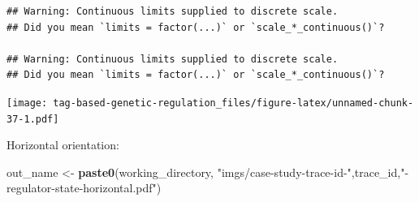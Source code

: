 \documentclass[
]{book}
\newenvironment{Shaded}{\begin{snugshade}}{\end{snugshade}}
\newcommand{\KeywordTok}[1]{\textcolor[rgb]{0.13,0.29,0.53}{\textbf{#1}}}
\newcommand{\NormalTok}[1]{#1}
\newcommand{\StringTok}[1]{\textcolor[rgb]{0.31,0.60,0.02}{#1}}
\begin{document}
\begin{verbatim}
## Warning: Continuous limits supplied to discrete scale.
## Did you mean `limits = factor(...)` or `scale_*_continuous()`?

## Warning: Continuous limits supplied to discrete scale.
## Did you mean `limits = factor(...)` or `scale_*_continuous()`?
\end{verbatim}

\texttt{[image: tag-based-genetic-regulation\_files/figure-latex/unnamed-chunk-37-1.pdf]}

Horizontal orientation:

\begin{Shaded}
\begin{Highlighting}[]
\NormalTok{out\_name \textless{}{-}}\StringTok{ }\KeywordTok{paste0}\NormalTok{(working\_directory, }\StringTok{"imgs/case{-}study{-}trace{-}id{-}"}\NormalTok{,trace\_id,}\StringTok{"{-}regulator{-}state{-}horizontal.pdf"}\NormalTok{)}


\end{Highlighting}
\end{Shaded}
\end{document}
